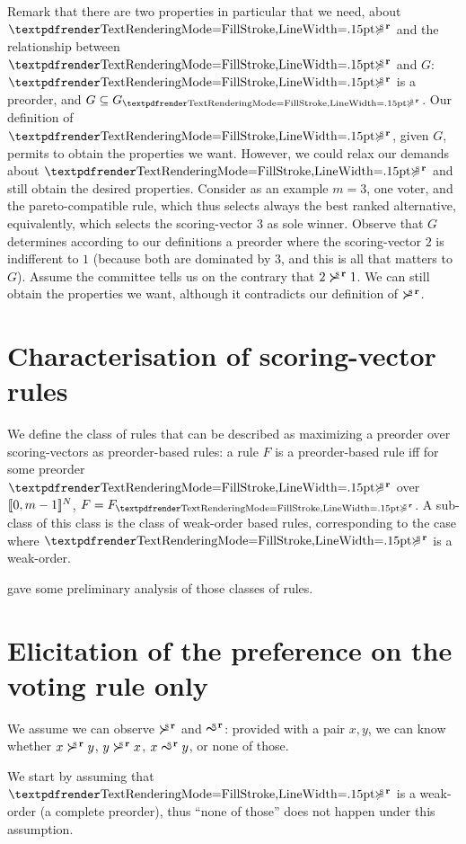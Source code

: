 \documentclass[version=last, pagesize, twoside=off, bibliography=totoc, DIV=calc, fontsize=14pt, a4paper, french, english]{scrartcl}
\begin{document}

Remark that there are two properties in particular that we need, about $\prefsv$ and the relationship between $\prefsv$ and $G$: $\prefsv$ is a preorder, and $G \subseteq G_{\prefsv}$. Our definition of $\prefsv$, given $G$, permits to obtain the properties we want. However, we could relax our demands about $\prefsv$ and still obtain the desired properties. Consider as an example $m = 3$, one voter, and the pareto-compatible rule, which thus selects always the best ranked alternative, equivalently, which selects the scoring-vector $3$ as sole winner. Observe that $G$ determines according to our definitions a preorder where the scoring-vector $2$ is indifferent to $1$ (because both are dominated by $3$, and this is all that matters to $G$). Assume the committee tells us on the contrary that $2 \mathrel{\boldsymbol{\succ}^{\text{\!\!\!s}\textbf{\,r}}} 1$. We can still obtain the properties we want, although it contradicts our definition of $\mathrel{\boldsymbol{\succ}^{\text{\!\!\!s}\textbf{\,r}}}$.

\section{Characterisation of scoring-vector rules}
We define the class of rules that can be described as maximizing a preorder over scoring-vectors as preorder-based rules: a rule $F$ is a preorder-based rule iff for some preorder $\prefsv$ over $\lbrack\!\lbrack{}0, m-1\rbrack\!\rbrack^N$, $F = F_{\prefsv}$. A sub-class of this class is the class of weak-order based rules, corresponding to the case where $\prefsv$ is a weak-order.

\citet{cailloux_eliciting_2014} gave some preliminary analysis of those classes of rules.


\section{Elicitation of the preference on the voting rule only}
We assume we can observe $\mathrel{\boldsymbol{\succ}^{\text{\!\!\!s}\textbf{\,r}}}$ and $\mathrel{\boldsymbol{\sim}^{\text{\!\!\!s}\textbf{\,r}}}$: provided with a pair $x, y$, we can know whether $x \mathrel{\boldsymbol{\succ}^{\text{\!\!\!s}\textbf{\,r}}} y$, $y \mathrel{\boldsymbol{\succ}^{\text{\!\!\!s}\textbf{\,r}}} x$, $x \mathrel{\boldsymbol{\sim}^{\text{\!\!\!s}\textbf{\,r}}} y$, or none of those.

We start by assuming that $\prefsv$ is a weak-order (a complete preorder), thus “none of those” does not happen under this assumption.
\end{document}

